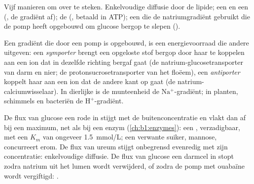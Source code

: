 \begin{omfigure}
{\small Vijf manieren om over te steken. Enkelvoudige diffusie door de lipide;
een  en een  (, de gradiënt af); de
 (, betaald in ATP); een  die
de natriumgradiënt gebruikt die de pomp heeft opgebouwd om glucose bergop te
slepen ().}
\end{omfigure}

\begin{proposition}\label{prop:b1:membranes-transport:secondary}
Een gradiënt die door een pomp is opgebouwd, is een energievoorraad die andere
 uitgeven: een \emph{symporter} brengt een opgeloste stof
bergop door haar te koppelen aan een ion dat in dezelfde richting bergaf gaat (de
natrium-glucosetransporter van darm en nier; de protonsucrosetransporter van het
floëem), een \emph{antiporter} koppelt haar aan een ion dat de
andere kant op gaat (de natrium-calciumwisselaar). In dierlijke  is de
munteenheid de $\mathrm{Na^+}$-gradiënt; in planten, schimmels en bacteriën de
$\mathrm{H^+}$-gradiënt.
\end{proposition}

\begin{example}\label{ex:b1:membranes-transport:kinetics}
De flux van glucose een rode  in stijgt met de buitenconcentratie en vlakt dan
af bij een maximum, net als bij een enzym (\cref{ch:b1:enzymes}): een ,
verzadigbaar, met een $K_m$ van ongeveer \qty{1.5}{mmol/L}; een verwante suiker,
mannose, concurreert erom. De flux van ureum stijgt onbegrensd evenredig met zijn
concentratie: enkelvoudige diffusie. De flux van glucose een darmcel in stopt
zodra natrium uit het lumen wordt verwijderd, of zodra de pomp met ouabaïne wordt
vergiftigd: .
\end{example}

